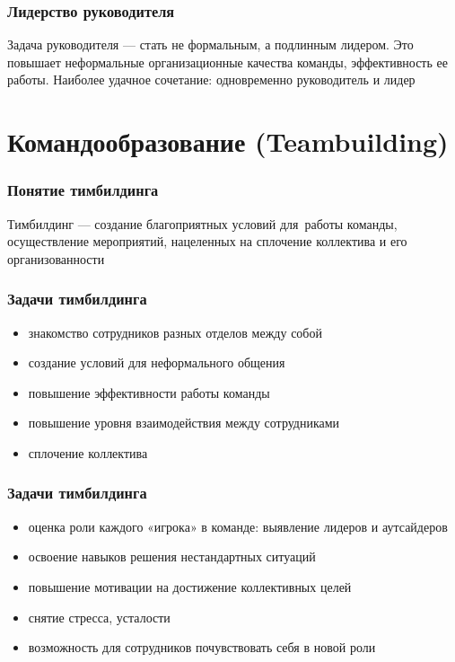 \documentclass{../industrial-development}
\begin{document}
\begin{frame} \frametitle {Лидерство руководителя}

\begin{block}{}
Задача руководителя --- стать не формальным, а подлинным лидером. Это повышает неформальные организационные качества команды, эффективность ее работы. Наиболее удачное сочетание: одновременно руководитель и лидер
\end{block}

\end{frame}




\section{Командообразование (Teambuilding)}

\begin{frame} \frametitle{Понятие тимбилдинга}
\begin{block}{}
Тимбилдинг --- создание благоприятных условий для~работы команды, осуществление мероприятий, нацеленных на сплочение коллектива и его организованности
\end{block}
\end{frame}

\begin{frame} \frametitle{Задачи тимбилдинга}
\begin{itemize}
\item знакомство сотрудников разных отделов между собой
\item создание условий для неформального общения
\item повышение эффективности работы команды
\item повышение уровня взаимодействия между сотрудниками
\item сплочение коллектива

\end{itemize}
\end{frame}

\begin{frame} \frametitle{Задачи тимбилдинга}
\begin{itemize}

\item оценка роли каждого «игрока» в команде: выявление лидеров и аутсайдеров
\item освоение навыков решения нестандартных ситуаций
\item повышение мотивации на достижение коллективных целей
\item снятие стресса, усталости
\item возможность для сотрудников почувствовать себя в новой роли
\end{itemize}
\end{frame}
\end{document}
